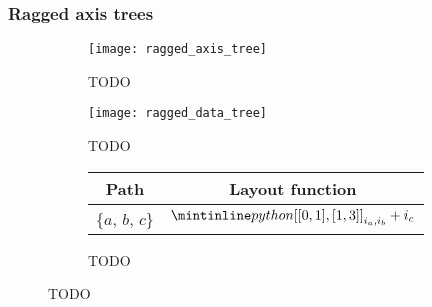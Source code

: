 \documentclass[thesis]{subfiles}
\begin{document}
\subsubsection{Ragged axis trees}
\label{sec:layout_alg_ragged}

\begin{figure}
  \centering
  \begin{subfigure}{.3\textwidth}
    \centering
    \texttt{[image: ragged\_axis\_tree]}
    \caption{TODO}
    \label{fig:ragged_axis_tree}
  \end{subfigure}
  \begin{subfigure}{.58\textwidth}
    \centering
    \texttt{[image: ragged\_data\_tree]}
    \caption{TODO}
    \label{fig:ragged_data_tree}
  \end{subfigure}

  \vspace{1em}

  \begin{subfigure}{\textwidth}
    \centering
    \begingroup  %
      \renewcommand{\arraystretch}{1.2}
      \begin{tabular}{c|c}
        \textbf{Path} & \textbf{Layout function} \\
        \hline
        \{$a$, $b$, $c$\} & $\pycode{[[0, 1], [1, 3]]}_{i_a,i_b} + i_c$ \\
      \end{tabular}
    \endgroup
    \caption{TODO}
    \label{fig:ragged_layouts}
  \end{subfigure}
  \caption{TODO}
  \label{fig:ragged_axis_tree_all}
\end{figure}
\end{document}
